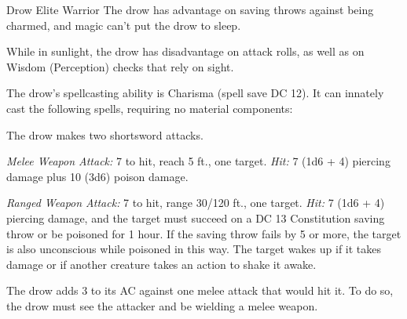 \documentclass[10pt,a4paper,twoside,bg=print,twocolumn,openany,nodeprecatedcode]{dndbook}
\begin{document}
\begin{DndMonster}[float=t]{Drow Elite Warrior}
\DndMonsterBasics[
armor-class = {18 (studded leather armor)},
hit-points = {\DndDice{11d8 + 22}},
speed = {30 ft.}
]
\DndMonsterAbilityScores[
 str = 13,
 dex = 18,
 con = 14,
 int = 11,
 wis = 13,
 cha = 12
]
\DndMonsterDetails[
saving-throws = {Dex +7, Con +5, Wis +4},
skills = {Perception +4, Stealth +10},
senses = {darkvision 120 ft., passive perception 14},
languages = {Elvish, Undercommon},
challenge = 5,
]
The drow has advantage on saving throws against being charmed, and magic can't put the drow to sleep.

While in sunlight, the drow has disadvantage on attack rolls, as well as on Wisdom (Perception) checks that rely on sight.

The drow's spellcasting ability is Charisma (spell save DC 12). It can innately cast the following spells, requiring no material components:
\begin{DndMonsterSpells}
\end{DndMonsterSpells}
The drow makes two shortsword attacks.

\textsl{Melee Weapon Attack:} 7 to hit, reach 5 ft., one target. \textsl{Hit:} 7 (1d6 + 4) piercing damage plus 10 (3d6) poison damage.

\textsl{Ranged Weapon Attack:} 7 to hit, range 30/120 ft., one target. \textsl{Hit:} 7 (1d6 + 4) piercing damage, and the target must succeed on a DC 13 Constitution saving throw or be poisoned for 1 hour. If the saving throw fails by 5 or more, the target is also unconscious while poisoned in this way. The target wakes up if it takes damage or if another creature takes an action to shake it awake.

The drow adds 3 to its AC against one melee attack that would hit it. To do so, the drow must see the attacker and be wielding a melee weapon.

\end{DndMonster}
\end{document}
